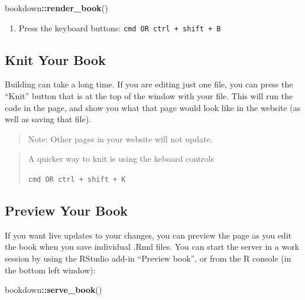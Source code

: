 \documentclass[
]{book}
\newenvironment{Shaded}{\begin{snugshade}}{\end{snugshade}}
\newcommand{\FunctionTok}[1]{\textcolor[rgb]{0.13,0.29,0.53}{\textbf{#1}}}
\newcommand{\NormalTok}[1]{#1}
\newcommand{\SpecialCharTok}[1]{\textcolor[rgb]{0.81,0.36,0.00}{\textbf{#1}}}
\providecommand{\tightlist}{%
  \setlength{\itemsep}{0pt}\setlength{\parskip}{0pt}}
\theoremstyle{definition}
\theoremstyle{definition}
\theoremstyle{definition}
\theoremstyle{definition}
\theoremstyle{remark}
\begin{document}
\begin{Shaded}
\begin{Highlighting}[]
\NormalTok{bookdown}\SpecialCharTok{::}\FunctionTok{render\_book}\NormalTok{()}
\end{Highlighting}
\end{Shaded}

\begin{enumerate}
\def\labelenumi{\arabic{enumi}.}
\setcounter{enumi}{1}
\tightlist
\item
  Press the keyboard buttons: \texttt{cmd\ OR\ ctrl\ +\ shift\ +\ B}
\end{enumerate}

\subsection{Knit Your Book}\label{knit-your-book}

Building can take a long time. If you are editing just one file, you can press the ``Knit'' button that is at the top of the window with your file. This will run the code in the page, and show you what that page would look like in the website (as well as saving that file).

\begin{quote}
Note: Other pages in your website will not update.
\end{quote}

\begin{quote}
A quicker way to knit is using the keboard controls

\texttt{cmd\ OR\ ctrl\ +\ shift\ +\ K}
\end{quote}

\subsection{Preview Your Book}\label{preview-your-book}

If you want live updates to your changes, you can preview the page as you edit the book when you save individual .Rmd files. You can start the server in a work session by using the RStudio add-in ``Preview book'', or from the R console (in the bottom left window):

\begin{Shaded}
\begin{Highlighting}[]
\NormalTok{bookdown}\SpecialCharTok{::}\FunctionTok{serve\_book}\NormalTok{()}
\end{Highlighting}
\end{Shaded}
\end{document}
